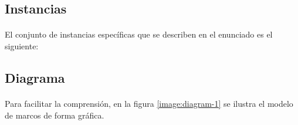 \documentclass[10pt, a4paper,spanish]{article}
\begin{document}
		\subsection{Instancias}

      \paragraph{}
      El conjunto de instancias específicas que se describen en el enunciado es el siguiente:

			\begin{figure}[H]
				\centering
        
			\end{figure}

			\begin{figure}[H]
				\centering
        
			\end{figure}

			\begin{figure}[H]
				\centering
        
			\end{figure}

			\begin{figure}[H]
				\centering
        
			\end{figure}

			\begin{figure}[H]
				\centering
        
			\end{figure}

		\subsection{Diagrama}

      \paragraph{}
      Para facilitar la comprensión, en la figura \ref{image:diagram-1} se ilustra el modelo de marcos de forma gráfica.
\end{document}

